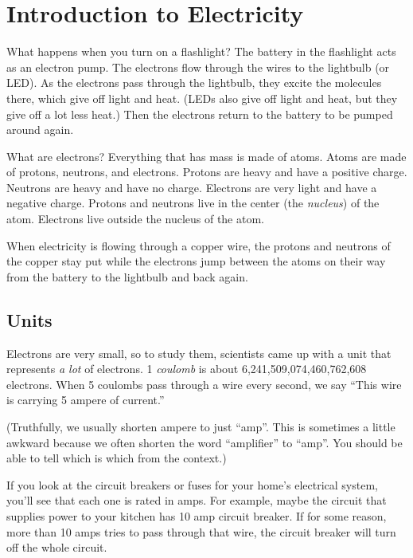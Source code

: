 \chapter{Introduction to Electricity}

What happens when you turn on a flashlight?  The battery in the
flashlight acts as an electron pump. The electrons flow through the
wires to the lightbulb (or LED).  As the electrons pass through the
lightbulb, they excite the molecules there, which give off light and
heat. (LEDs also give off light and heat, but they give off a lot less
heat.) Then the electrons return to the battery to be pumped around
again.

What are electrons? Everything that has mass is made of atoms. Atoms
are made of protons, neutrons, and electrons.  Protons are heavy and
have a positive charge. Neutrons are heavy and have no
charge. Electrons are very light and have a negative charge. Protons
and neutrons live in the center (the \textit{nucleus}) of the
atom. Electrons live outside the nucleus of the atom.

When electricity is flowing through a copper wire, the protons and
neutrons of the copper stay put while the electrons jump between the
atoms on their way from the battery to the lightbulb and back again.

\section{Units}

Electrons are very small, so to study them, scientists came up with a
unit that represents \textit{a lot} of electrons. 1 \textit{coulomb}
is about 6,241,509,074,460,762,608 electrons.  When 5 coulombs pass
through a wire every second, we say ``This wire is carrying 5 ampere of
current.''

(Truthfully, we usually shorten ampere to just ``amp''.  This is
sometimes a little awkward because we often shorten the word
``amplifier'' to ``amp''. You should be able to tell which is which
from the context.)

If you look at the circuit breakers or fuses for your home's
electrical system, you'll see that each one is rated in amps.  For
example, maybe the circuit that supplies power to your kitchen has 10
amp circuit breaker. If for some reason, more than 10 amps tries to
pass through that wire, the circuit breaker will turn off the whole
circuit.

